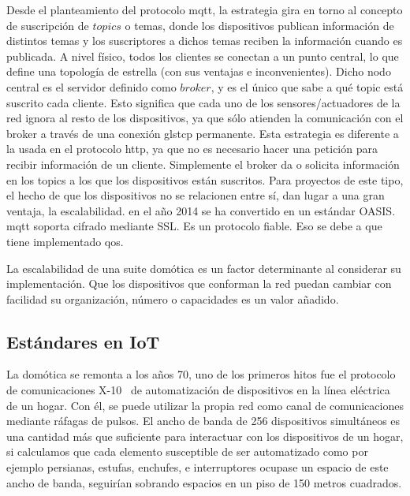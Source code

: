 Desde el planteamiento del protocolo \gls{mqtt}, la estrategia gira en torno al concepto de suscripción de $topics$ o temas, donde los dispositivos publican información de distintos temas y los suscriptores a dichos temas reciben la información cuando es publicada. A nivel físico, todos los clientes se conectan a un punto central, lo que define una topología de estrella (con sus ventajas e inconvenientes). Dicho nodo central es el servidor definido como $broker$, y es el único que sabe a qué topic está suscrito cada cliente. Esto significa que cada uno de los sensores/actuadores de la red ignora al resto de los dispositivos, ya que sólo atienden la comunicación con el broker a través de una conexión gls{tcp} permanente. Esta estrategia es diferente a la usada en el protocolo \gls{http}, ya que no es necesario hacer una petición para recibir información de un cliente. Simplemente el broker da o solicita información en los topics a los que los dispositivos están suscritos. Para proyectos de este tipo, el hecho de que los dispositivos no se relacionen entre sí, dan lugar a una gran ventaja, la escalabilidad. en el año 2014 se ha convertido en un estándar OASIS. \gls{mqtt} soporta cifrado mediante SSL. Es un protocolo fiable. Eso se debe a que tiene implementado \gls{qos}.

\vspace{1cm}

La escalabilidad de una suite domótica es un factor determinante al considerar su implementación. Que los dispositivos que conforman la red puedan cambiar con facilidad su organización, número o capacidades es un valor añadido.


\subsection{Estándares en IoT}
\label{ch:Capitulo2.3.3}

La domótica se remonta a los años 70, uno de los primeros hitos fue el protocolo de comunicaciones X-10~\cite{x10protocolwikipedia} de automatización de dispositivos en la línea eléctrica de un hogar. Con él, se puede utilizar la propia red como canal de comunicaciones mediante ráfagas de pulsos. El ancho de banda de 256 dispositivos simultáneos es una cantidad más que suficiente para interactuar con los dispositivos de un hogar, si calculamos que cada elemento susceptible de ser automatizado como por ejemplo persianas, estufas, enchufes, e interruptores ocupase un espacio de este ancho de banda, seguirían sobrando espacios en un piso de 150 metros cuadrados.

